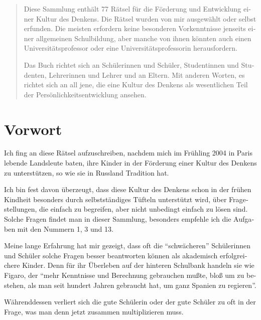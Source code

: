 
\setdefaultlanguage{german}
\DeclareSIUnit[number-unit-product=\,]
\DeclareSIUnit[number-unit-product=\,]




\begin{abstract}
Diese Sammlung enthält 77 Rätsel für die Förderung und Entwicklung einer Kultur des Denkens. Die Rätsel wurden von mir ausgewählt oder selbst erfunden. Die meisten erfordern keine besonderen Vorkenntnisse jenseits einer allgemeinen Schulbildung, aber manche von ihnen könnten auch einen Universitätsprofessor oder eine Uni\-ver\-si\-täts\-pro\-fes\-sorin herausfordern.

	Das Buch richtet sich an Schülerinnen und Schüler, Studentinnen und Studenten, Lehrerinnen und Lehrer und an Eltern. Mit anderen Worten, es richtet sich an all jene, die eine Kultur des Denkens als wesentlichen Teil der Persönlichkeitsentwicklung ansehen.
\end{abstract}
\clearpage

\section*{Vorwort}
	Ich fing an diese Rätsel aufzuschreiben, nachdem mich im Frühling 2004 in Paris lebende Landsleute baten, ihre Kinder in der Förderung einer Kultur des Denkens zu unterstützen, so wie sie in Russland Tradition hat.

	Ich bin fest davon überzeugt, dass diese Kultur des Denkens schon in der frühen Kindheit besonders durch selbstständiges Tüfteln unterstützt wird, über Fragestellungen, die einfach zu begreifen, aber nicht unbedingt einfach zu lösen sind. Solche Fragen findet man in dieser Sammlung, besonders empfehle ich die Aufgaben mit den Nummern 1, 3 und 13.

	Meine lange Erfahrung hat mir gezeigt, dass oft die \enquote{schwächeren} Schü\-le\-rin\-nen und Schüler solche Fragen besser beantworten können als akademisch erfolgreichere Kinder. Denn für ihr Überleben auf der hinteren Schulbank handeln sie wie Figaro, der \enquote{mehr Kenntnisse und Berechnung gebrauchen mußte, bloß um zu bestehen, als man seit hundert Jahren gebraucht hat, um ganz Spanien zu regieren}.

	Währenddessen verliert sich die gute Schülerin oder der gute Schüler zu oft in der Frage, was man denn jetzt zusammen multiplizieren muss.

